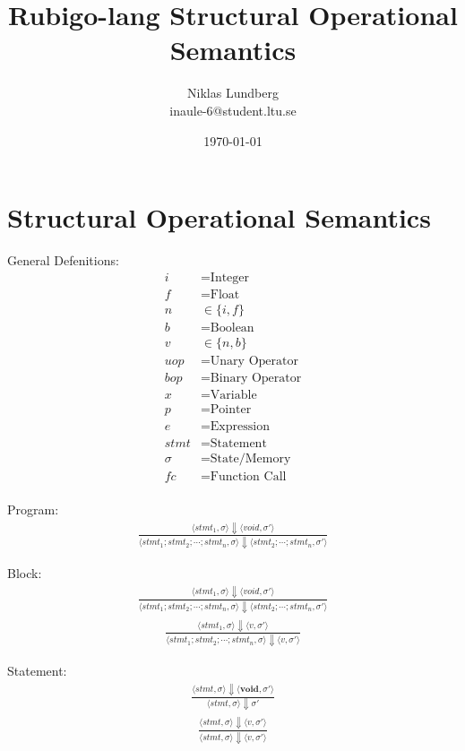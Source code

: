 \documentclass[12pt]{article}
\title{Rubigo-lang Structural Operational Semantics}
\author{Niklas Lundberg \\ inaule-6@student.ltu.se}
\date{\today}
\begin{document}
    \maketitle
    \newpage


    \section{Structural Operational Semantics}
	General Defenitions:
    	\begin{align*}
		i &= \text{Integer} \\
		f &= \text{Float} \\
		n &\in \{i, f\} \\
		b &= \text{Boolean} \\
		v &\in \{n, b\} \\
		uop &= \text{Unary Operator} \\
		bop &= \text{Binary Operator} \\
		x &= \text{Variable} \\
		p &= \text{Pointer} \\
		e &= \text{Expression} \\
		stmt &= \text{Statement} \\
		\sigma &= \text{State/Memory} \\
		fc &= \text{Function Call} \\
	\end{align*}

	Program:
	\begin{align*}
		\frac{\langle stmt_1, \sigma \rangle\Downarrow \langle void, \sigma' \rangle}
		{\langle stmt_1;stmt_2;\cdots;stmt_n, \sigma \rangle\Downarrow \langle stmt_2;\cdots;stmt_n, \sigma' \rangle}
	\end{align*}

	Block:
	\begin{align*}
		\frac{\langle stmt_1, \sigma \rangle\Downarrow \langle void, \sigma' \rangle}
		{\langle stmt_1;stmt_2;\cdots;stmt_n, \sigma \rangle\Downarrow \langle stmt_2;\cdots;stmt_n, \sigma' \rangle}
	\end{align*}
	\begin{align*}
		\frac{\langle stmt_1, \sigma \rangle\Downarrow \langle v, \sigma' \rangle}
		{\langle stmt_1;stmt_2;\cdots;stmt_n, \sigma \rangle\Downarrow \langle v, \sigma' \rangle}
	\end{align*}

	Statement:
	\begin{align*}
		\frac{\langle stmt, \sigma \rangle\Downarrow \langle \textbf{void}, \sigma' \rangle}
		{\langle stmt, \sigma \rangle\Downarrow \sigma'}
	\end{align*}
	\begin{align*}
		\frac{\langle stmt, \sigma \rangle\Downarrow \langle v, \sigma' \rangle}
		{\langle stmt, \sigma \rangle\Downarrow \langle v, \sigma' \rangle}
	\end{align*}
\end{document}

